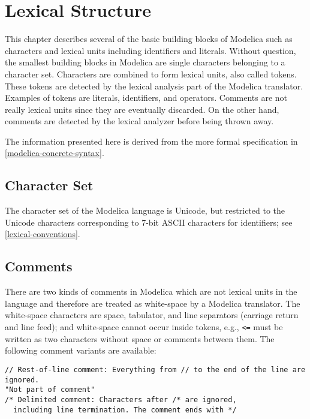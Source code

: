 \chapter{Lexical Structure}\label{lexical-structure}

This chapter describes several of the basic building blocks of Modelica such as characters and lexical units including identifiers and literals.
Without question, the smallest building blocks in Modelica are single characters belonging to a character set.
Characters are combined to form lexical units, also called tokens.
These tokens are detected by the lexical analysis part of the Modelica translator.
Examples of tokens are literals, identifiers, and operators.
Comments are not really lexical units since they are eventually discarded.
On the other hand, comments are detected by the lexical analyzer before being thrown away.

The information presented here is derived from the more formal specification in \cref{modelica-concrete-syntax}.


\section{Character Set}\label{character-set}

The character set of the Modelica language is Unicode, but restricted to the Unicode characters corresponding to 7-bit ASCII characters for identifiers; see \cref{lexical-conventions}.


\section{Comments}\label{comments}

There are two kinds of comments in Modelica which are not lexical units in the language and therefore are treated as white-space by a Modelica translator.
The white-space characters are space, tabulator, and line separators (carriage return and line feed); and white-space cannot occur inside tokens, e.g., \lstinline!<=! must be written as two characters without space or comments between them.
The following comment variants are available:
\begin{lstlisting}[language=modelica]
// Rest-of-line comment: Everything from // to the end of the line are ignored.
"Not part of comment"
/* Delimited comment: Characters after /* are ignored,
  including line termination. The comment ends with */
\end{lstlisting}

